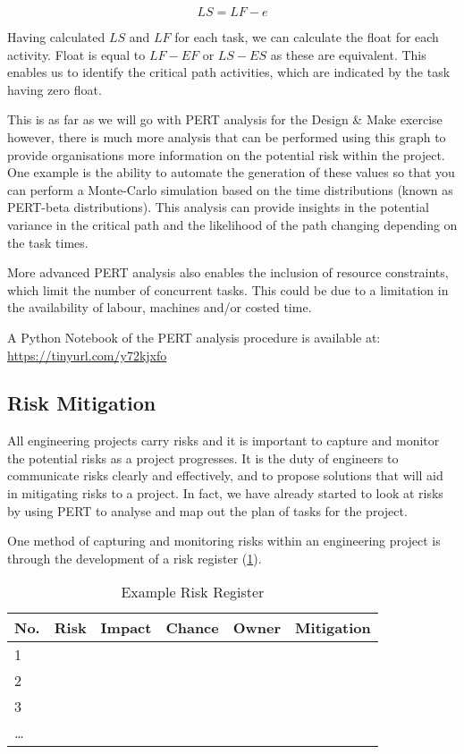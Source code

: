 \begin{equation}
  LS = LF - e
\end{equation}

Having calculated $LS$ and $LF$ for each task, we can calculate the float for each activity. Float is equal to $LF - EF$ or $LS - ES$ as these are equivalent. This enables us to identify the critical path activities, which are indicated by the task having zero float.


This is as far as we will go with \ac{PERT} analysis for the Design \& Make exercise however, there is much more analysis that can be performed using this graph to provide organisations more information on the potential risk within the project. One example is the ability to automate the generation of these values so that you can perform a Monte-Carlo simulation based on the time distributions (known as \ac{PERT}-beta distributions). This analysis can provide insights in the potential variance in the critical path and the likelihood of the path changing depending on the task times\cite{davis2008}.

More advanced \ac{PERT} analysis also enables the inclusion of resource constraints, which limit the number of concurrent tasks. This could be due to a limitation in the availability of labour, machines and/or costed time.

A Python Notebook of the \ac{PERT} analysis procedure is available at: \\ \url{https://tinyurl.com/y72kjxfo}


\subsection{Risk Mitigation} 

All engineering projects carry risks and it is important to capture and monitor the potential risks as a project progresses. It is the duty of engineers to communicate risks clearly and effectively, and to propose solutions that will aid in mitigating risks to a project. In fact, we have already started to look at risks by using PERT to analyse and map out the plan of tasks for the project.

One method of capturing and monitoring risks within an engineering project is through the development of a risk register (\cref{tbl-risk}).

\begin{table}[h!]
  \centering
  \caption{Example Risk Register}
  \label{tbl-risk}
  \begin{tabular}{l l l l l l}
    \toprule
      No. & Risk & Impact & Chance & Owner & Mitigation \\
    \midrule
      1 \\
      2 \\
      3 \\
      \ldots \\
    \bottomrule
  \end{tabular}
\end{table}

